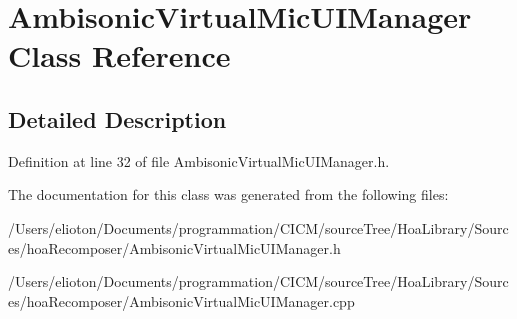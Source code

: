\hypertarget{class_ambisonic_virtual_mic_u_i_manager}{\section{Ambisonic\-Virtual\-Mic\-U\-I\-Manager Class Reference}
\label{class_ambisonic_virtual_mic_u_i_manager}
}


\subsection{Detailed Description}


Definition at line 32 of file Ambisonic\-Virtual\-Mic\-U\-I\-Manager.\-h.



The documentation for this class was generated from the following files\-:\begin{DoxyCompactItemize}
\item 
/\-Users/elioton/\-Documents/programmation/\-C\-I\-C\-M/source\-Tree/\-Hoa\-Library/\-Sources/hoa\-Recomposer/Ambisonic\-Virtual\-Mic\-U\-I\-Manager.\-h\item 
/\-Users/elioton/\-Documents/programmation/\-C\-I\-C\-M/source\-Tree/\-Hoa\-Library/\-Sources/hoa\-Recomposer/Ambisonic\-Virtual\-Mic\-U\-I\-Manager.\-cpp\end{DoxyCompactItemize}
